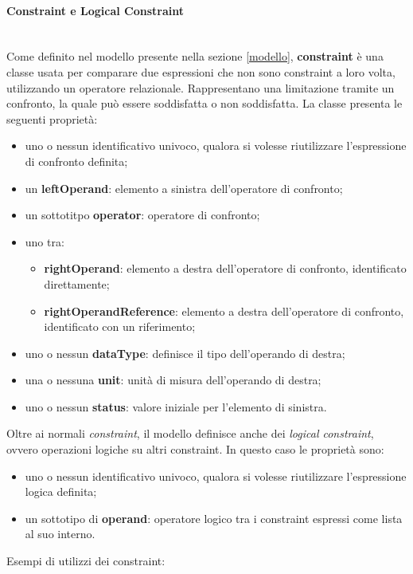 \documentclass[12pt,a4paper,twoside]{book}
\begin{document}
\paragraph{Constraint e Logical Constraint}\mbox{}\\
Come definito nel modello presente nella sezione \ref{modello}, \textbf{constraint} è una classe usata per comparare due espressioni che non sono constraint a loro volta, utilizzando un operatore relazionale. Rappresentano una limitazione tramite un confronto, la quale può essere soddisfatta o non soddisfatta. La classe presenta le seguenti proprietà:
\begin{itemize}
	\item uno o nessun identificativo univoco, qualora si volesse riutilizzare l'espressione di confronto definita;
	\item un \textbf{leftOperand}: elemento a sinistra dell'operatore di confronto;
	\item un sottotitpo \textbf{operator}: operatore di confronto;
	\item uno tra: 
	\begin{itemize}
		\item \textbf{rightOperand}: elemento a destra dell'operatore di confronto, identificato direttamente;
		\item \textbf{rightOperandReference}: elemento a destra dell'operatore di confronto, identificato con un riferimento; 
	\end{itemize} 
	\item uno o nessun \textbf{dataType}: definisce il tipo dell'operando di destra;
	\item una o nessuna \textbf{unit}: unità di misura dell'operando di destra;
	\item uno o nessun \textbf{status}: valore iniziale per l'elemento di sinistra.
\end{itemize}
Oltre ai normali \textit{constraint}, il modello definisce anche dei \textit{logical constraint}, ovvero operazioni logiche su altri constraint. In questo caso le proprietà sono:
\begin{itemize}
	\item uno o nessun identificativo univoco, qualora si volesse riutilizzare l'espressione logica definita;
	\item un sottotipo di \textbf{operand}: operatore logico tra i constraint espressi come lista al suo interno.
\end{itemize}\newpage
Esempi di utilizzi dei constraint: 
\end{document}
